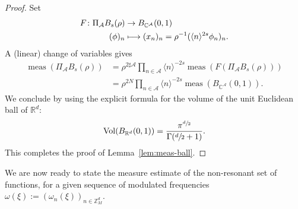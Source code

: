 \documentclass[JEP,XML,SOM,Unicode,published]{cedram}
\newcommand\mto{\mathchoice{\longmapsto}{\mapsto}{\mapsto}{\mapsto}}
\theoremstyle{plain}
\theoremstyle{definition}
\DeclareMathOperator{\meas}{meas}
\DeclareMathOperator{\vol}{Vol}
\newcommand{\Z}{\mathbb{Z}}
\newcommand{\R}{\mathbb{R}}
\newcommand{\C}{\mathbb{C}}
\newcommand{\1}{\mathbf{1}}
\begin{document}
\begin{proof}
Set
\[
\begin{aligned}
F\colon \Pi_{\mathcal{A}}B_{s}(\rho)&\to B_{\C^{\mathcal{A}}}(0,1) \\
(\phi)_{n}&\mto (x_{n})_{n} = \rho^{-1}(\langle n\rangle^{2s}\phi_{n})_{n}.
\end{aligned}
\]
A (linear) change of variables gives
\begin{equation*}
\begin{split}
\meas(\Pi_{\mathcal{A}}B_{s}(\rho))
&= \rho^{2\sharp\mathcal{A}}
\prod_{n\in\mathcal{A}}\langle n\rangle^{-2s}
\meas(F(\Pi_{\mathcal{A}}B_{s}(\rho))) \\
&= \rho^{2N}\prod_{n\in\mathcal{A}}\langle n\rangle^{-2s} \meas(B_{\C^{\mathcal{A}}}(0,1)).
\end{split}
\end{equation*}
We conclude by using the explicit formula for the volume of the unit Euclidean ball of $\R^{d}$:
\[
\vol(B_{\R^{d}}(0,1)) = \frac{\pi^{\sfrac{d}{2}}}{\Gamma(\sfrac{d}{2}+1)}.
\]
This completes the proof of Lemma~\ref{lem:meas-ball}.
\end{proof}
We are now ready to state the measure estimate of the non-resonant set of functions, for a given sequence of modulated frequencies $\omega(\xi):=(\omega_{n}(\xi))_{n\in\Z_{M}^{d}}$.
\end{document}
